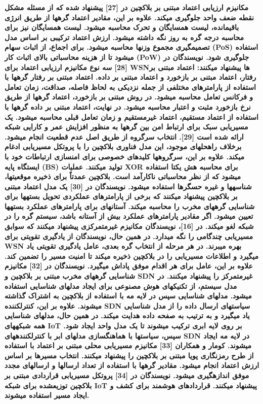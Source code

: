 \documentclass{article} %
\begin{document}
\noindent 
{\bf مکانیزم ارزیابی اعتماد مبتنی بر بلاکچین در [27] پیشنهاد شده که از مسئله مشکل نقطه ضعف واحد جلوگیری میکند. علاوه بر این، مقادیر اعتماد گرهها از طریق انرژی باقیمانده، لیست همسایگان و تحرک محاسبه میشود. لیست همسایگان نیز برای محاسبه درجه گره به روز نگه داشته میشود. ارزش اعتماد ترکیبی بر اساس مدل تصمیمگیری مجموع وزنها محاسبه میشود. برای اجماع، از اثبات سهام (PoS) استفاده میشود تا از هزینه محاسباتی بالای اثبات کار (PoW) جلوگیری شود. نویسندگان در [28] سه نوع مکانیزم ارزیابی اعتماد برای WSNها پیشنهاد میکنند: اعتماد مبتنی بر رفتار، اعتماد مبتنی بر بازخورد و اعتماد مبتنی بر داده. اعتماد مبتنی بر رفتار گرهها با استفاده از پارامترهای مختلفی از جمله نزدیکی به لحاظ فاصله، صداقت، زمان تعامل و فرکانس تعامل محاسبه میشود. در روش مبتنی بر بازخورد، اعتماد گرهها از طریق نرخ بازخورد مثبت و اعتبار محاسبه میشود. در نهایت، اعتماد مبتنی بر داده گرهها با استفاده از اعتماد مستقیم، اعتماد غیرمستقیم و زمان تعامل قبلی محاسبه میشود. یک مسیریابی سبک برای ارتباط امن بین گرهها به منظور افزایش عمر و کارایی شبکه ارائه شده است [29]. انتخاب سرگروه از طریق اصل عدم قطعیت انجام میشود. برخلاف راهحلهای موجود، این مدل فناوری بلاکچین را با پروتکل مسیریابی ادغام میکند. علاوه بر این، سرگروهها کلیدهای خصوصی برای امنسازی ارتباطات خود با ایستگاه پایه (BS) تولید میکنند. عملیات XOR برای محاسبه هش یکتا استفاده میشود که از نظر محاسباتی ناکارآمد است. بلاکچین عمدتاً برای ذخیره موقعیتها، شناسهها و غیره حسگرها استفاده میشود. نویسندگان در [30] یک مدل اعتماد مبتنی بر بلاکچین پیشنهاد میکنند که برخی از پارامترهای عملکردی تحویل بستهها برای شناسایی گرههای مخرب را محاسبه میکند. آستانهای برای پارامترهای عملکرد بستهها تعیین میشود. اگر مقادیر پارامترهای عملکرد بیش از آستانه باشد، سیستم گره را در شبکه لغو میکند. در [16]، نویسندگان مکانیزم غیرمتمرکزی پیشنهاد میکنند که سوابق مسیریابی چندگامی را نگه میدارد. در همین حال، نویسندگان از یادگیری تقویتی برای WSN بهره میبرند. در هر مرحله از انتخاب گره بعدی، عامل یادگیری تقویتی یاد میگیرد و اطلاعات مسیریابی را در بلاکچین ذخیره میکند تا امنیت مسیر را تضمین کند. علاوه بر این، عامل برای هر اقدام موفق پاداش میگیرد. نویسندگان در [32] مکانیزم شناسایی گرههای مخرب مبتنی بر بلاکچین و SDN غیرمتمرکز را پیشنهاد میکنند. در مدل سیستم، از تکنیکهای هوش مصنوعی برای ایجاد مدلهای شناسایی استفاده میشود. مدلهای شناسایی سپس در لایه مه با استفاده از بلاکچین به اشتراک گذاشته میشوند. علاوه بر این، کنترلکننده SDN سیاستهای ارسال داده را از مدل شناسایی یاد میگیرد و به ترتیب به صفحه داده هدایت میکند. در همین حال، مدلهای شناسایی همه شبکههای IoT بر روی لایه ابری ترکیب میشوند تا یک مدل واحد ایجاد شود. سپس، سیاستها با هماهنگسازی مدلهای ابر با کنترلکنندههای SDN در لایه مه ایجاد میشوند. کومار و همکاران [33] مکانیزم مسیریابی محلی مبتنی بر اعتماد با استفاده از طرح رمزنگاری پویا مبتنی بر بلاکچین را پیشنهاد میکنند. انتخاب مسیرها بر اساس ارزش اعتماد انجام میشود. مقادیر گرهها با استفاده از تعداد ارسالها و ارسالهای مجدد موفق اندازهگیری میشود. نویسندگان در [34] پروتکل مسیریابی قراردادی مبتنی بر بلاکچین توزیعشده برای شبکه IoT پیشنهاد میکنند. قراردادهای هوشمند برای کشف و ایجاد مسیر استفاده میشوند.}
\end{document}
